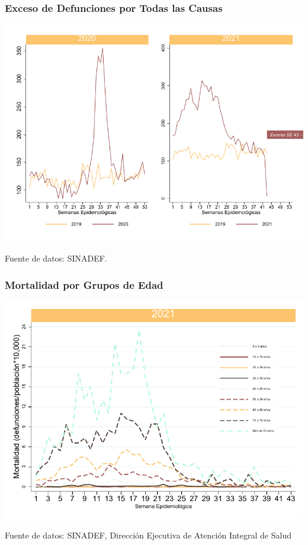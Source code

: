 \documentclass[xcolor=table]{beamer}
\begin{document}
	\begin{frame}
		\frametitle{Exceso de Defunciones por Todas las Causas}
		\vspace{-.5cm}
		\begin{center}
			\includegraphics[width=0.9\linewidth]{../figuras/exceso_region.pdf}
		\end{center}
		{\tiny Fuente de datos: SINADEF.} 
	\end{frame}
	
	\begin{frame}
		\frametitle{Mortalidad por Grupos de Edad}
		\vspace{-.5cm}
		\begin{center}
			\includegraphics[width=0.9\linewidth]{../figuras/mortalidad_edad.pdf}
		\end{center}
		{\tiny Fuente de datos: SINADEF, Dirección Ejecutiva de Atención Integral de Salud} 
	\end{frame}
\end{document}
